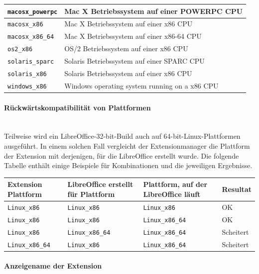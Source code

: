 \documentclass[a4paper,10pt,pagesize,titlepage]{scrbook}
\begin{document}
\begin{tabular}{ |p{3cm}|p{9cm} | }
    \hline
    \verb|macosx_powerpc| &	Mac X Betriebssystem auf einer POWERPC CPU\\
    \hline
    \verb|macosx_x86| &	Mac X Betriebssystem auf einer x86 CPU\\
    \hline
    \verb|macosx_x86_64| & 	Mac X Betriebssystem auf einer x86-64 CPU\\
    \hline
    \verb|os2_x86| & OS/2 Betriebssystem auf einer x86 CPU\\
    \hline
    \verb|solaris_sparc| & 	Solaris Betriebssystem auf einer SPARC CPU\\
    \hline
    \verb|solaris_x86| & Solaris Betriebssystem auf einer x86 CPU\\
    \hline
    \verb|windows_x86| & Windows operating system running on a x86 CPU\\ 
    \bottomrule
\end{tabular}

\paragraph*{Rückwärtskompatibilität von Plattformen}$~~$\\
Teilweise wird ein LibreOffice-32-bit-Build auch auf 64-bit-Linux-Plattformen ausgeführt. In einem solchen Fall vergleicht der Extensionmanager die Plattform der Extension mit derjenigen, für die LibreOffice erstellt wurde. Die folgende Tabelle enthält einige Beispiele für Kombinationen und die jeweiligen Ergebnisse. 


\begin{tabular}{|p{3.0cm}|p{3.0cm}|p{3.0cm}|p{1.5cm}|}
	\hline \rowcolor{hellgrau} \rule[-2ex]{0pt}{5.5ex}  Extension Plattform & LibreOffice erstellt für Plattform & Plattform, auf der LibreOffice läuft  & Resultat \\
	\hline \rule[-2ex]{0pt}{5.5ex} \verb|Linux_x86 | & \verb|Linux_x86 | & \verb|Linux_x86 | & OK \\ 
	\hline \rule[-2ex]{0pt}{5.5ex} \verb|Linux_x86 | & \verb|Linux_x86 | & \verb|Linux_x86_64 | & OK \\ 
	\hline \rule[-2ex]{0pt}{5.5ex} \verb|Linux_x86 | & \verb|Linux_x86_64 | & \verb|Linux_x86_64 | & Scheitert \\ 
	\hline \rule[-2ex]{0pt}{5.5ex} \verb|Linux_x86_64 | & \verb|Linux_x86 | & \verb|Linux_x86_64 | & Scheitert \\ 
	\hline 
\end{tabular}
\paragraph*{Anzeigename der Extension}$~~$\\
\end{document}
